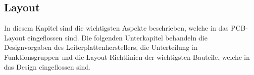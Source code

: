 \subsection{Layout}
\label{sec:Layout}

In diesem Kapitel sind die wichtigsten Aspekte beschrieben, welche in das PCB-Layout eingeflossen sind. Die folgenden Unterkapitel behandeln die Designvorgaben des Leiterplattenherstellers, die Unterteilung in Funktionsgruppen und die Layout-Richtlinien der wichtigsten Bauteile, welche in das Design eingeflossen sind.
